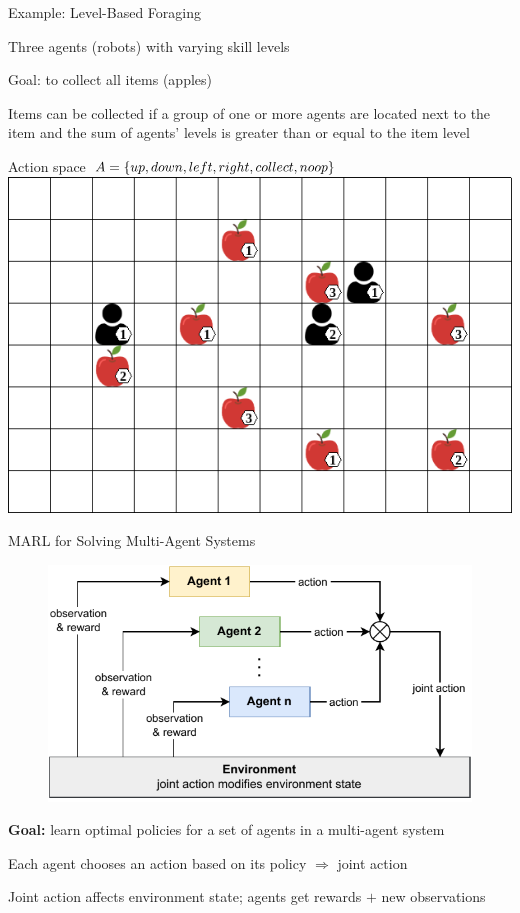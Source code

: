 \begin{frame}{Example: Level-Based Foraging}
	\bcol
		    \blist
		        \item Three agents (robots) with varying skill levels
		        \item Goal: to collect all items (apples)
		        \item Items can be collected if a group of one or more agents are located next to the item and the sum of agents' levels is greater than or equal to the item level
		        \item Action space $A = \{up, down, left, right, collect, noop\}$
		    \elist
    		\centering
 	        \includegraphics[width=\textwidth]{images/environments/lbf/foraging_8x12_b.png}
 	 \ecol
\end{frame}

\begin{frame}{MARL for Solving Multi-Agent Systems}

    \begin{figure}
        \centering
        \includegraphics[width=.6\textwidth]{images/chapter_1/MARL-loop.pdf}
    \end{figure} 

    \blist
        \item {\bf Goal:} learn optimal policies for a set of agents in a multi-agent system
        \item Each agent chooses an action based on its policy $\Rightarrow$ joint action
        \item Joint action affects environment state; agents get rewards $+$ new observations
     \elist
\end{frame}

